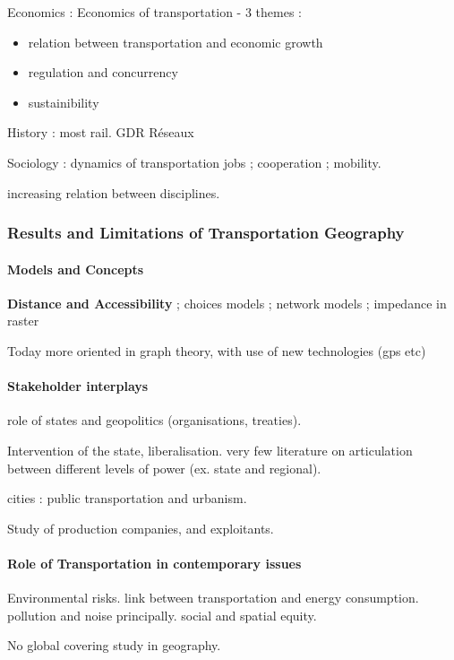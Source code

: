 Economics : Economics of transportation - 3 themes :
\begin{itemize}
\item relation between transportation and economic growth
\item regulation and concurrency
\item sustainibility
\end{itemize}

History : most rail. GDR R{\'e}seaux

Sociology : dynamics of transportation jobs ; cooperation ; mobility.

increasing relation between disciplines.

\subsubsection{Results and Limitations of Transportation Geography}

\paragraph{Models and Concepts}

\textbf{Distance and Accessibility} ; choices models ; network models ; impedance in raster

Today more oriented in graph theory, with use of new technologies (gps etc)

\paragraph{Stakeholder interplays}

role of states and geopolitics (organisations, treaties).

Intervention of the state, liberalisation. very few literature on articulation between different levels of power (ex. state and regional).

cities : public transportation and urbanism.

Study of production companies, and exploitants. 

\paragraph{Role of Transportation in contemporary issues}

Environmental risks. link between transportation and energy consumption. pollution and noise principally. social and spatial equity.

No global covering study in geography.


